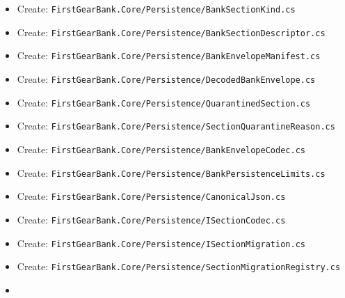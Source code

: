 \documentclass[
  10pt,
  letterpaper,
]{article}
\providecommand{\tightlist}{%
  \setlength{\itemsep}{0pt}\setlength{\parskip}{0pt}}
\begin{document}
\begin{itemize}
\tightlist
\item
  Create:
  \texttt{FirstGearBank.}\allowbreak{}\texttt{Core/}\allowbreak{}\texttt{Persistence/}\allowbreak{}\texttt{BankSectionKind.}\allowbreak{}\texttt{cs}
\item
  Create:
  \texttt{FirstGearBank.}\allowbreak{}\texttt{Core/}\allowbreak{}\texttt{Persistence/}\allowbreak{}\texttt{BankSectionDescriptor.}\allowbreak{}\texttt{cs}
\item
  Create:
  \texttt{FirstGearBank.}\allowbreak{}\texttt{Core/}\allowbreak{}\texttt{Persistence/}\allowbreak{}\texttt{BankEnvelopeManifest.}\allowbreak{}\texttt{cs}
\item
  Create:
  \texttt{FirstGearBank.}\allowbreak{}\texttt{Core/}\allowbreak{}\texttt{Persistence/}\allowbreak{}\texttt{DecodedBankEnvelope.}\allowbreak{}\texttt{cs}
\item
  Create:
  \texttt{FirstGearBank.}\allowbreak{}\texttt{Core/}\allowbreak{}\texttt{Persistence/}\allowbreak{}\texttt{QuarantinedSection.}\allowbreak{}\texttt{cs}
\item
  Create:
  \texttt{FirstGearBank.}\allowbreak{}\texttt{Core/}\allowbreak{}\texttt{Persistence/}\allowbreak{}\texttt{SectionQuarantineReason.}\allowbreak{}\texttt{cs}
\item
  Create:
  \texttt{FirstGearBank.}\allowbreak{}\texttt{Core/}\allowbreak{}\texttt{Persistence/}\allowbreak{}\texttt{BankEnvelopeCodec.}\allowbreak{}\texttt{cs}
\item
  Create:
  \texttt{FirstGearBank.}\allowbreak{}\texttt{Core/}\allowbreak{}\texttt{Persistence/}\allowbreak{}\texttt{BankPersistenceLimits.}\allowbreak{}\texttt{cs}
\item
  Create:
  \texttt{FirstGearBank.}\allowbreak{}\texttt{Core/}\allowbreak{}\texttt{Persistence/}\allowbreak{}\texttt{CanonicalJson.}\allowbreak{}\texttt{cs}
\item
  Create:
  \texttt{FirstGearBank.}\allowbreak{}\texttt{Core/}\allowbreak{}\texttt{Persistence/}\allowbreak{}\texttt{ISectionCodec.}\allowbreak{}\texttt{cs}
\item
  Create:
  \texttt{FirstGearBank.}\allowbreak{}\texttt{Core/}\allowbreak{}\texttt{Persistence/}\allowbreak{}\texttt{ISectionMigration.}\allowbreak{}\texttt{cs}
\item
  Create:
  \texttt{FirstGearBank.}\allowbreak{}\texttt{Core/}\allowbreak{}\texttt{Persistence/}\allowbreak{}\texttt{SectionMigrationRegistry.}\allowbreak{}\texttt{cs}
\item

\end{itemize}
\end{document}
